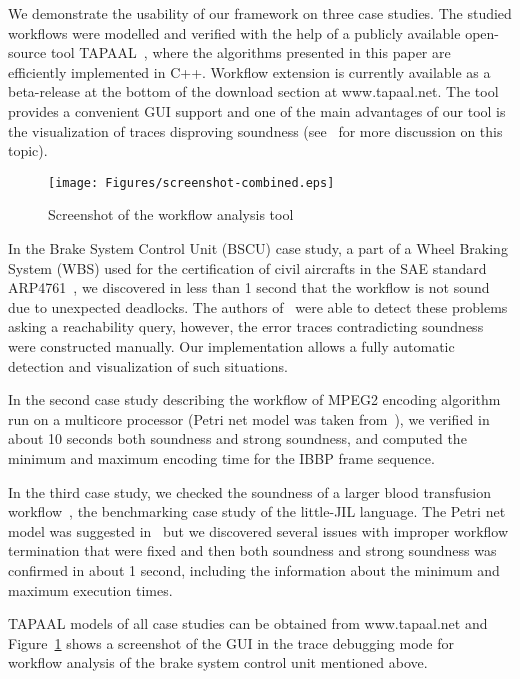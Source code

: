 We demonstrate the usability of our framework on three case studies.
The studied workflows were modelled and verified with the help of 
a publicly available open-source tool TAPAAL~\cite{DJJJMS:TACAS:12}, where
the algorithms presented in this paper are efficiently implemented
in C++. Workflow extension is currently available 
as a beta-release at the bottom of the download section at www.tapaal.net. 
The tool provides a convenient GUI support and
one of the main advantages of our tool is the visualization of traces
disproving soundness (see~\cite{FF:AWPN:06} for more discussion on 
this topic).

\begin{figure}[h]
\begin{center}
\texttt{[image: Figures/screenshot-combined.eps]}
\end{center}
\caption{Screenshot of the workflow analysis tool}
\label{fig:screenshot}
\end{figure}

In the Brake System Control Unit (BSCU) case study, a part of a 
Wheel Braking System (WBS) used for the certification of civil aircrafts 
in the SAE standard ARP4761~\cite{SEB:FESCA:13}, we discovered  
in less than 1 second that the workflow is not sound due to 
unexpected deadlocks. The authors of~\cite{SEB:FESCA:13} 
were able to detect these problems asking a reachability query,
however, the error traces contradicting soundness were constructed
manually. Our implementation allows a fully automatic detection and
visualization of such situations.

In the second case study describing the workflow of MPEG2 encoding algorithm
run on a multicore processor (Petri net model was taken 
from~\cite{PCVMP:MMM:04}), we verified in about 10 seconds 
both soundness and strong soundness, and computed 
the minimum and maximum encoding time for the IBBP frame sequence.

In the third case study, we checked the soundness 
of a larger blood transfusion workflow~\cite{blood-benchmark},
the benchmarking case study of the little-JIL language. 
The Petri net model was suggested in~\cite{BLS:FHIES:12} but we discovered 
several issues with improper workflow termination that were fixed
and then both soundness and strong soundness was confirmed
in about 1 second, including the information about the minimum 
and maximum execution times. 

TAPAAL models of all case studies can be obtained from www.tapaal.net
and Figure~\ref{fig:screenshot} shows a screenshot of the GUI in the
trace debugging mode for workflow analysis of the brake system control 
unit mentioned above.

